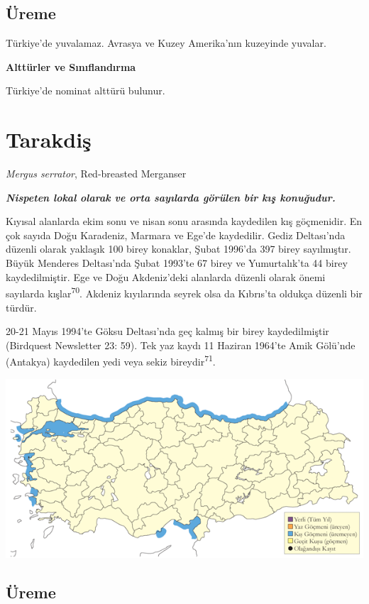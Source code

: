 \documentclass[
  letterpaper,
  DIV=11,
  numbers=noendperiod]{scrreprt}
\begin{document}
\hypertarget{uxfcreme-32}{%
\subsection{\texorpdfstring{\textbf{Üreme}}{Üreme}}\label{uxfcreme-32}}

Türkiye'de yuvalamaz. Avrasya ve Kuzey Amerika'nın kuzeyinde yuvalar.

\textbf{Alttürler ve Sınıflandırma}

Türkiye'de nominat alttürü bulunur.

\hypertarget{tarakdiux15f}{%
\section{Tarakdiş}\label{tarakdiux15f}}

\emph{Mergus serrator}, Red-breasted Merganser

\textbf{\emph{Nispeten lokal olarak ve orta sayılarda görülen bir kış
konuğudur.}}

Kıyısal alanlarda ekim sonu ve nisan sonu arasında kaydedilen kış
göçmenidir. En çok sayıda Doğu Karadeniz, Marmara ve Ege'de kaydedilir.
Gediz Deltası'nda düzenli olarak yaklaşık 100 birey konaklar, Şubat
1996'da 397 birey sayılmıştır. Büyük Menderes Deltası'nda Şubat 1993'te
67 birey ve Yumurtalık'ta 44 birey kaydedilmiştir. Ege ve Doğu
Akdeniz'deki alanlarda düzenli olarak önemi sayılarda
kışlar\textsuperscript{70}. Akdeniz kıyılarında seyrek olsa da Kıbrıs'ta
oldukça düzenli bir türdür.

20-21 Mayıs 1994'te Göksu Deltası'nda geç kalmış bir birey
kaydedilmiştir (Birdquest Newsletter 23: 59). Tek yaz kaydı 11 Haziran
1964'te Amik Gölü'nde (Antakya) kaydedilen yedi veya sekiz
bireydir\textsuperscript{71}.

\includegraphics{images/harita_Page_034.png}

\hypertarget{uxfcreme-33}{%
\subsection{\texorpdfstring{\textbf{Üreme}}{Üreme}}\label{uxfcreme-33}}
\end{document}

